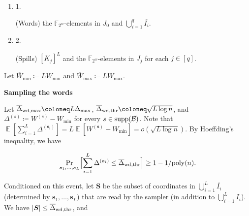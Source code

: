\documentclass[10pt,a4paper]{article}
\begin{document}
\begin{enumerate}


\item[] 
1. 


(Words) the $\mathbb{F}_{2^{w}}$-elements in $J_{0}$ and $\bigcup_{i=1}^{q}\overline{I_{i}}$.\par





\item[] 
2. 


(Spills) $[K_{j}]^{L}$ and the $\mathbb{F}_{2^{w}}$-elements in $J_{j}$ for each $j\in[q]$.\par





\end{enumerate}




Let $\overline{W}_{\min}\coloneq LW_{\min}$ and $\overline{W}_{\max}\coloneq LW_{\max}$.\par




\par\medskip\noindent\textbf{Sampling the words}\par




Let $\overline{\Delta}_{{\rm wd},\max}\coloneq L\Delta_{\max}$, $\overline{\Delta}_{{\rm wd},{\rm thr}}\coloneq\sqrt{L\log n}$, and $\Delta^{(s)}\coloneq W^{(s)}-W_{\min}$ for every $s\in{\rm supp}(\mathcal{B})$.
Note that $\operatorname{\mathbb{E}}[\sum_{i=1}^{L}\Delta^{(\boldsymbol{s}_{i})}]=L\operatorname{\mathbb{E}}[W^{(\boldsymbol{s})}-W_{\min}]=o(\sqrt{L\log n})$.
By Hoeffding’s inequality, we have\par


\[\begin{gathered}
\Pr_{\boldsymbol{s}_{1},\ldots,\boldsymbol{s}_{L}}\Bigl[\sum_{i=1}^{L}\Delta^{(\boldsymbol{s}_{i})}\leq\overline{\Delta}_{{\rm wd},{\rm thr}}\Bigr]\geq 1-1/\textnormal{poly}(n).
\end{gathered}\]


Conditioned on this event, let $\boldsymbol{S}$ be the subset of coordinates in $\bigcup_{i=1}^{L}\overline{I_{i}}$ (determined by $\boldsymbol{s}_{1},\ldots,\boldsymbol{s}_{L}$) that are read by the sampler (in addition to $\bigcup_{i=1}^{L}I_{i}$).
We have $\lvert\boldsymbol{S}\rvert\leq\overline{\Delta}_{{\rm wd},{\rm thr}}$, and\par
\end{document}
